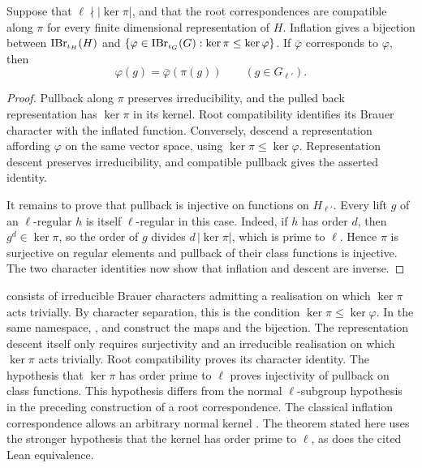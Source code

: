\begin{theorem}
\label{lib:brauer:quotient-equivalence}
Suppose that $\ell\nmid|\ker \pi|$, and that the root correspondences
are compatible along $\pi$ for every finite dimensional representation
of $H$. Inflation gives a bijection between
$\operatorname{IBr}_{\iota_H}(H)$ and
$\{\varphi\in\operatorname{IBr}_{\iota_G}(G):\ker \pi\leq\ker\varphi\}$.
If $\bar\varphi$ corresponds to $\varphi$, then
\[
 \varphi(g)=\bar\varphi(\pi(g))\qquad(g\in G_{\ell'}).
\]
\end{theorem}
\begin{proof}
Pullback along $\pi$ preserves irreducibility, and the pulled back
representation has $\ker \pi$ in its kernel. Root compatibility identifies
its Brauer character with the inflated function. Conversely, descend a
representation affording $\varphi$ on the same vector space, using
$\ker \pi\leq\ker\varphi$.
Representation descent preserves irreducibility, and compatible
pullback gives the asserted identity.

It remains to prove that pullback is injective on functions on $H_{\ell'}$. Every lift
$g$ of an $\ell$-regular $h$ is itself $\ell$-regular in this case.
Indeed, if $h$ has order $d$, then $g^d\in\ker \pi$, so the order of $g$ divides
$d\,|\ker \pi|$, which is prime to $\ell$. Hence $\pi$ is surjective on
regular elements and pullback of their class functions is injective.
The two character identities now show that inflation and descent are inverse.
\end{proof}

\begin{implementation}
consists of irreducible Brauer characters admitting a realisation on
which $\ker \pi$ acts trivially. By character separation, this is the
condition $\ker \pi\leq\ker\varphi$. In the same namespace,
,  and
 construct the maps and the
bijection. The representation descent itself only requires surjectivity
and an irreducible realisation on which $\ker \pi$ acts trivially. Root
compatibility proves its character identity. The hypothesis that $\ker \pi$
has order prime to $\ell$ proves injectivity of pullback on class functions.
This hypothesis differs from the normal $\ell$-subgroup hypothesis in
the preceding construction of a root correspondence.
The classical inflation correspondence allows an arbitrary normal kernel
\cite[p.~39]{Navarro1998}. The theorem stated here uses the stronger
hypothesis that the kernel has order prime to $\ell$, as does the cited
Lean equivalence.
\end{implementation}

